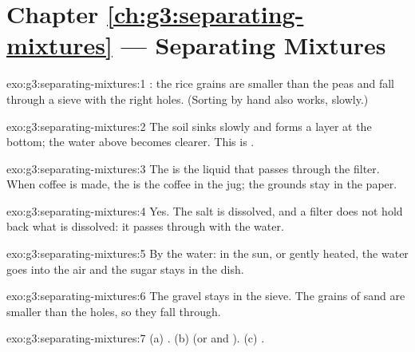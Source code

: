 \section*{Chapter \ref{ch:g3:separating-mixtures} --- Separating Mixtures}

\begin{solution}{exo:g3:separating-mixtures:1}
: the rice grains are smaller than the peas and fall through a
sieve with the right holes. (Sorting by hand also works, slowly.)
\end{solution}

\begin{solution}{exo:g3:separating-mixtures:2}
The soil sinks slowly and forms a layer at the bottom; the water above
becomes clearer. This is .
\end{solution}

\begin{solution}{exo:g3:separating-mixtures:3}
The  is the liquid that passes through the filter. When coffee
is made, the  is the coffee in the jug; the grounds stay in the
paper.
\end{solution}

\begin{solution}{exo:g3:separating-mixtures:4}
Yes. The salt is dissolved, and a filter does not hold back what is
dissolved: it passes through with the water.
\end{solution}

\begin{solution}{exo:g3:separating-mixtures:5}
By  the water: in the sun, or gently heated, the water goes
into the air and the sugar stays in the dish.
\end{solution}

\begin{solution}{exo:g3:separating-mixtures:6}
The gravel stays in the sieve. The grains of sand are smaller than the
holes, so they fall through.
\end{solution}

\begin{solution}{exo:g3:separating-mixtures:7}
(a) . (b)  (or  and ). (c) .
\end{solution}

